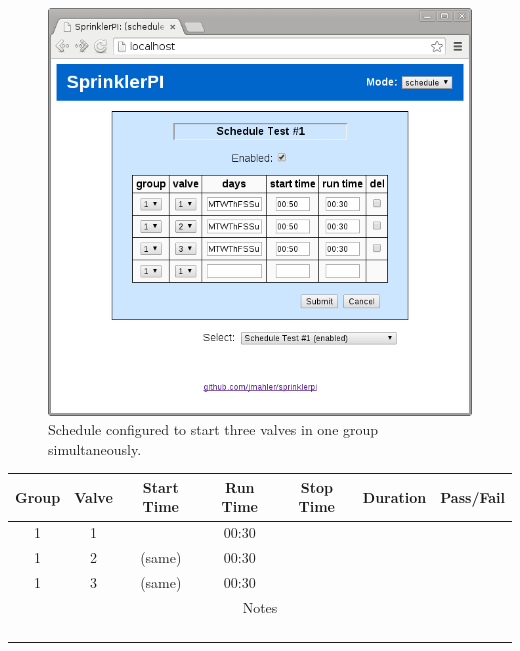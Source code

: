 \documentclass{article}
\begin{document}
\begin{enumerate}
	\begin{figure}[hbp!]
	\begin{center}
	\includegraphics[scale=0.5]{img/www-schedule_test1}
	\end{center}
	\caption{Schedule configured to start three valves in one group
		simultaneously.}
	\label{fig:www-schedule_test1}
	\end{figure}

	\vspace{1em}
	\begin{center}
	\begin{tabular}{|c|c|c|c|c|c|c|}
		\hline
		Group & Valve & Start Time & Run Time & Stop Time & Duration & Pass/Fail \\
		\hline
		1 & 1 & & 00:30 & & & \hspace{4em} \\
		\hline
		1 & 2 & (same) & 00:30 & & & \\
		\hline
		1 & 3 & (same) & 00:30 & & & \\
		\hline
		\hline
		\multicolumn{7}{|c|}{Notes} \\
		\multicolumn{7}{|c|}{} \\
		\multicolumn{7}{|c|}{} \\
		\multicolumn{7}{|c|}{} \\
		\multicolumn{7}{|c|}{} \\
		\hline
	\end{tabular}
	\end{center}

\end{enumerate}
\end{document}
